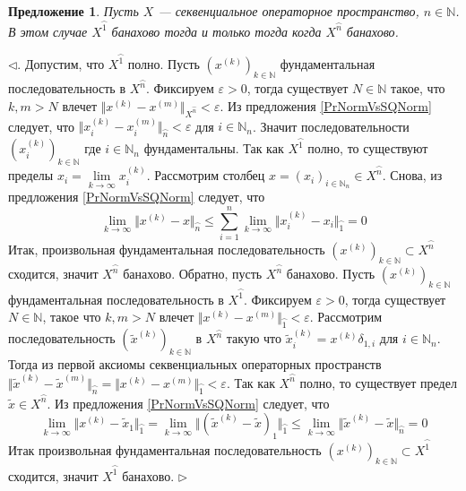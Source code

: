 \documentclass[12pt]{article}
\newtheorem{proposition}[theorem]{Предложение}
\newenvironment{proof}{\par $\triangleleft$}{$\triangleright$}
\begin{document}
\begin{proposition}\label{PrSQSpaceComplSoAmplISCompl}
Пусть $X$ --- секвенциальное операторное пространство, $n\in\mathbb{N}$. В этом случае $X^{\wideparen{1}}$ банахово тогда и только тогда когда $X^{\wideparen{n}}$ банахово.
\end{proposition}
\begin{proof}. Допустим, что $X^{\wideparen{1}}$ полно. Пусть $(x^{(k)})_{k\in\mathbb{N}}$ фундаментальная последовательность в $X^{\wideparen{n}}$. Фиксируем $\varepsilon>0$, тогда существует $N\in\mathbb{N}$ такое, что $k,m> N$ 
влечет $\Vert x^{(k)}-x^{(m)}\Vert_{X^{\wideparen{n}}}<\varepsilon$. Из предложения \ref{PrNormVsSQNorm} следует, что $\Vert x_i^{(k)}-x_i^{(m)}\Vert_{\wideparen{n}}<\varepsilon$ для $i\in\mathbb{N}_n$. Значит последовательности 
$(x_i^{(k)})_{k\in\mathbb{N}}$ где $i\in\mathbb{N}_n$ фундаментальны. Так как $X^{\wideparen{1}}$ полно, то существуют пределы $x_i=\lim\limits_{k\to\infty}x_i^{(k)}$. Рассмотрим столбец $x=(x_i)_{i\in\mathbb{N}_n}\in  X^{\wideparen{n}}$. 
Снова, из предложения \ref{PrNormVsSQNorm} следует, что
$$
\lim_{k\to\infty}\Vert x^{(k)}-x\Vert_{\wideparen{n}}\leq\sum\limits_{i=1}^n\lim\limits_{k\to\infty}\Vert x_i^{(k)}-x_i\Vert_{\wideparen{1}}=0
$$
Итак, произвольная фундаментальная последовательность $(x^{(k)})_{k\in\mathbb{N}}\subset X^{\wideparen{n}}$ сходится, значит $X^{\wideparen{n}}$ банахово. Обратно, пусть $X^{\wideparen{n}}$ банахово. Пусть $(x^{(k)})_{k\in\mathbb{N}}$ 
фундаментальная последовательность в $X^{\wideparen{1}}$. Фиксируем $\varepsilon>0$, тогда существует $N\in\mathbb{N}$, такое что $k,m> N$ влечет $\Vert x^{(k)}-x^{(m)}\Vert_{\wideparen{1}}<\varepsilon$.  Рассмотрим последовательность 
$(\tilde{x}^{(k)})_{k\in\mathbb{N}}$ в $X^{\wideparen{n}}$ такую что $\tilde{x}_i^{(k)}=x^{(k)}\delta_{1,i}$ для $i\in\mathbb{N}_n$. Тогда из первой аксиомы секвенциальных операторных пространств 
$\Vert \tilde{x}^{(k)}-\tilde{x}^{(m)}\Vert_{\wideparen{n}}=\Vert x^{(k)}-x^{(m)}\Vert_{\wideparen{1}}<\varepsilon$. Так как $X^{\wideparen{n}}$ полно, то существует предел $\tilde{x}\in X^{\wideparen{n}}$. Из предложения 
\ref{PrNormVsSQNorm} следует, что
$$
\lim\limits_{k\to\infty}\Vert x^{(k)}-\tilde{x}_1\Vert_{\wideparen{1}}
=\lim\limits_{k\to\infty}\Vert (\tilde{x}^{(k)}-\tilde{x})_1\Vert_{\wideparen{1}}
\leq\lim\limits_{k\to\infty}\Vert \tilde{x}^{(k)}-\tilde{x}\Vert_{\wideparen{n}}=0
$$
Итак произвольная фундаментальная последовательность $(x^{(k)})_{k\in\mathbb{N}}\subset X^{\wideparen{1}}$ сходится, значит $X^{\wideparen{1}}$ банахово. 
\end{proof}
\end{document}
